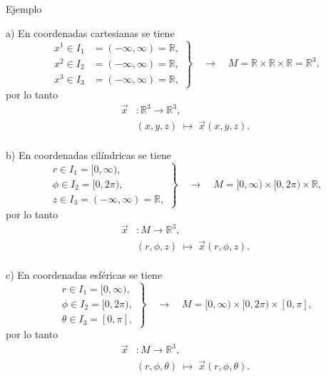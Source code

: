 \documentclass[../apunte_mecanica_clasica.tex]{subfiles}%
\begin{document}
\begin{apuntebloque}{Ejemplo}

a) En coordenadas cartesianas se tiene
\begin{equation*}
    \left.\begin{aligned}
        x^{1}\in I_{1}&=(-\infty,\infty)=\mathbb{R},\\[4pt]
        x^{2}\in I_{2}&=(-\infty,\infty)=\mathbb{R},\\[4pt]
        x^{3}\in I_{3}&=(-\infty,\infty)=\mathbb{R},
    \end{aligned}\right\} \quad
\to \quad M=\mathbb{R}\times \mathbb{R}\times \mathbb{R} = \mathbb{R}^3,
\end{equation*}
por lo tanto
\begin{align*}
\vec{x} &: \mathbb{R}^{3}\to\mathbb{R}^{3}, \\[4pt]  &(x,y,z)\;\mapsto\;\vec{x}(x,y,z).
\end{align*}
\\
b) En coordenadas cilíndricas se tiene
\begin{equation*}
    \left.\begin{aligned}
        r \in I_{1} = [0,\infty),\\[4pt]
        \phi \in I_{2} = [0,2\pi),\\[4pt]
        z \in I_{3} = (-\infty,\infty)=\mathbb{R},
    \end{aligned}\right\} \quad
\to \quad M=[0,\infty)\times[0,2\pi)\times\mathbb{R},
\end{equation*}
por lo tanto
\begin{align*}
\vec{x} &: M \to \mathbb{R}^3, \\[4pt]  
&(r,\phi,z)\;\mapsto\;\vec{x}(r,\phi,z).
\end{align*}
\\

c) En coordenadas esféricas se tiene
\begin{equation*}
    \left.\begin{aligned}
        r \in I_{1} = [0,\infty),\\[4pt]
        \phi \in I_{2} = [0,2\pi),\\[4pt]
        \theta \in I_{3} = [0,\pi],
    \end{aligned}\right\} \quad
\to \quad M=[0,\infty)\times[0,2\pi)\times[0,\pi],
\end{equation*}
por lo tanto
\begin{align*}
\vec{x} &: M \to \mathbb{R}^3, \\[4pt]  
&(r,\phi,\theta)\;\mapsto\;\vec{x}(r,\phi,\theta).
\end{align*}
\end{apuntebloque}
\end{document}
